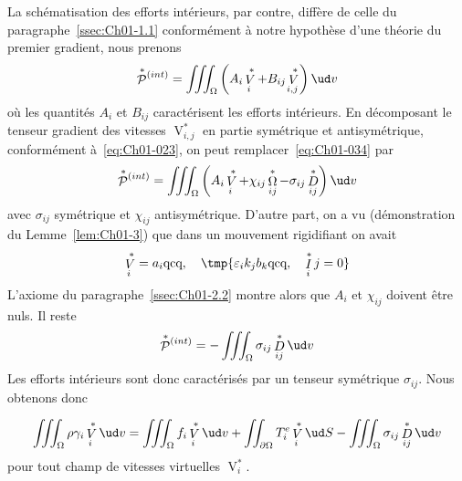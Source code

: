 La schématisation des efforts intérieurs, par contre, diffère de celle du paragraphe~\ref{ssec:Ch01-1.1} conformément à notre hypothèse d'une théorie du premier gradient, nous prenons
\begin{equation}
    \mathop{\mathcal{P}}^{\ast}{\!}^{(int)} = \iiint_{\Omega} \left( A_i \mathop{V}^{\ast}_i + B_{ij} \mathop{V}^{\ast}_{i,j} \right) \ud v
    \label{eq:Ch01-034}
\end{equation}
où les quantités $A_i$ et $B_{ij}$ caractérisent les efforts intérieurs.
En décomposant le tenseur gradient des vitesses $\mathop{V}^{\ast}_{i,j}$ en partie symétrique et antisymétrique, conformément à~\eqref{eq:Ch01-023}, on peut remplacer~\eqref{eq:Ch01-034} par
\begin{equation}
    \mathop{\mathcal{P}}^{\ast}{\!}^{(int)} = \iiint_{\Omega} \left( A_i \mathop{V}^{\ast}_i + \chi_{ij} \mathop{\Omega}^{\ast}_{ij} - \sigma_{ij} \mathop{D}^{\ast}_{ij} \right) \ud v
    \label{eq:Ch01-035} 
\end{equation}
avec $\sigma_{ij}$ symétrique et $\chi_{ij}$ antisymétrique.
D'autre part, on a vu (démonstration du Lemme~\ref{lem:Ch01-3}) que dans un mouvement rigidifiant on avait
\begin{equation}
    \mathop{V}^{\ast}_i = a_i \text{qcq}, \quad \tmp{\varepsilon_i k_j b_k \text{qcq}, \quad \mathop{I}^{\ast}_ij = 0}
    \label{eq:Ch01-036}
\end{equation}
L'axiome du paragraphe~\ref{ssec:Ch01-2.2} montre alors que $A_i$ et $\chi_{ij}$ doivent être nuls.
Il reste
\begin{equation}
    \mathop{\mathcal{P}}^{\ast}{\!}^{(int)} = -\iiint_{\Omega} \sigma_{ij} \mathop{D}^{\ast}_{ij} \ud v
    \label{eq:Ch01-037}
\end{equation}
Les efforts intérieurs sont donc caractérisés par un tenseur symétrique $\sigma_{ij}$.
Nous obtenons donc 
\begin{Principe}
    \begin{equation}
        \iiint_{\Omega} \rho \gamma_i \mathop{V}^{\ast}_i \ud v = \iiint_{\Omega} f_i \mathop{V}^{\ast}_i \ud v + \iint_{\partial \Omega} T_i^e \mathop{V}^{\ast}_i \ud S - \iiint_{\Omega} \sigma_{ij} \mathop{D}^{\ast}_{ij} \ud v
        \label{eq:Ch01-038}
    \end{equation}
    pour tout champ de vitesses virtuelles $\mathop{V}^{\ast}_i$.
\end{Principe}

